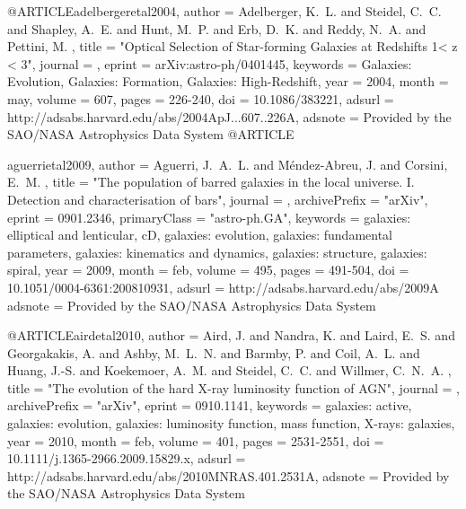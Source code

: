 @ARTICLE{adelbergeretal2004,
   author = {{Adelberger}, K.~L. and {Steidel}, C.~C. and {Shapley}, A.~E. and 
	{Hunt}, M.~P. and {Erb}, D.~K. and {Reddy}, N.~A. and {Pettini}, M.
	},
    title = "{Optical Selection of Star-forming Galaxies at Redshifts 1<  z < 3}",
  journal = {\apj},
   eprint = {arXiv:astro-ph/0401445},
 keywords = {Galaxies: Evolution, Galaxies: Formation, Galaxies: High-Redshift},
     year = 2004,
    month = may,
   volume = 607,
    pages = {226-240},
      doi = {10.1086/383221},
   adsurl = {http://adsabs.harvard.edu/abs/2004ApJ...607..226A},
  adsnote = {Provided by the SAO/NASA Astrophysics Data System}
}
@ARTICLE{aguerrietal2009,
   author = {{Aguerri}, J.~A.~L. and {M{\'e}ndez-Abreu}, J. and {Corsini}, E.~M.
	},
    title = "{The population of barred galaxies in the local universe. I. Detection and characterisation of bars}",
  journal = {\aap},
archivePrefix = "arXiv",
   eprint = {0901.2346},
 primaryClass = "astro-ph.GA",
 keywords = {galaxies: elliptical and lenticular, cD, galaxies: evolution, galaxies: fundamental parameters, galaxies: kinematics and dynamics, galaxies: structure, galaxies: spiral},
     year = 2009,
    month = feb,
   volume = 495,
    pages = {491-504},
      doi = {10.1051/0004-6361:200810931},
   adsurl = {http://adsabs.harvard.edu/abs/2009A%
  adsnote = {Provided by the SAO/NASA Astrophysics Data System}
}


@ARTICLE{airdetal2010,
   author = {{Aird}, J. and {Nandra}, K. and {Laird}, E.~S. and {Georgakakis}, A. and 
	{Ashby}, M.~L.~N. and {Barmby}, P. and {Coil}, A.~L. and {Huang}, {J.-S.} and 
	{Koekemoer}, A.~M. and {Steidel}, C.~C. and {Willmer}, C.~N.~A.
	},
    title = "{The evolution of the hard X-ray luminosity function of AGN}",
  journal = {\mnras},
archivePrefix = "arXiv",
   eprint = {0910.1141},
 keywords = {galaxies: active, galaxies: evolution, galaxies: luminosity function, mass function, X-rays: galaxies},
     year = 2010,
    month = feb,
   volume = 401,
    pages = {2531-2551},
      doi = {10.1111/j.1365-2966.2009.15829.x},
   adsurl = {http://adsabs.harvard.edu/abs/2010MNRAS.401.2531A},
  adsnote = {Provided by the SAO/NASA Astrophysics Data System}
}



}
